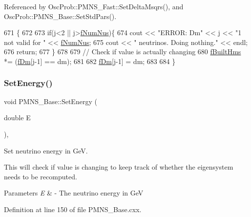 Referenced by Osc\+Prob\+::\+P\+M\+N\+S\+\_\+\+Fast\+::\+Set\+Delta\+Msqrs(), and Osc\+Prob\+::\+P\+M\+N\+S\+\_\+\+Base\+::\+Set\+Std\+Pars().


\begin{DoxyCode}
671 \{
672 
673   \textcolor{keywordflow}{if}(j<2 || j>\hyperlink{classOscProb_1_1PMNS__Base_a24bb74bed63569dfe88b18fa6a08060e}{fNumNus})\{
674     cout << \textcolor{stringliteral}{"ERROR: Dm"} << j << \textcolor{stringliteral}{"1 not valid for "} << \hyperlink{classOscProb_1_1PMNS__Base_a24bb74bed63569dfe88b18fa6a08060e}{fNumNus};
675     cout << \textcolor{stringliteral}{" neutrinos. Doing nothing."} << endl;
676     \textcolor{keywordflow}{return};
677   \}
678 
679   \textcolor{comment}{// Check if value is actually changing}
680   \hyperlink{classOscProb_1_1PMNS__Base_a9ac3cadeac8db1b90f3152f476244780}{fBuiltHms} *= (\hyperlink{classOscProb_1_1PMNS__Base_a406a31c3b5d620e5a0cace5b411f9f70}{fDm}[j-1] == dm);
681 
682   \hyperlink{classOscProb_1_1PMNS__Base_a406a31c3b5d620e5a0cace5b411f9f70}{fDm}[j-1] = dm;
683 
684 \}
\end{DoxyCode}
\mbox{\label{classOscProb_1_1PMNS__Base_a95b3b0d0cab5e6a54b5ef99587f837c0}} 
\subsubsection{\texorpdfstring{Set\+Energy()}{SetEnergy()}}
{\footnotesize\ttfamily void P\+M\+N\+S\+\_\+\+Base\+::\+Set\+Energy (\begin{DoxyParamCaption}\item[{double}]{E }\end{DoxyParamCaption})\hspace{0.3cm}{\ttfamily [virtual]}, {\ttfamily [inherited]}}

Set neutrino energy in GeV.

This will check if value is changing to keep track of whether the eigensystem needs to be recomputed.


\begin{DoxyParams}{Parameters}
{\em E} & -\/ The neutrino energy in GeV \\
\hline
\end{DoxyParams}


Definition at line 150 of file P\+M\+N\+S\+\_\+\+Base.\+cxx.



